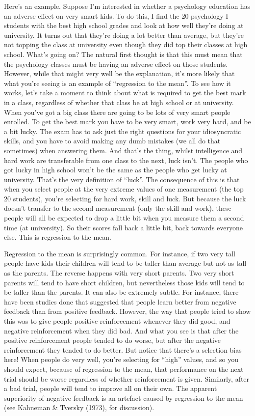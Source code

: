\documentclass[
  letterpaper,
]{book}
\begin{document}
Here's an example. Suppose I'm interested in whether a psychology
education has an adverse effect on very smart kids. To do this, I find
the 20 psychology I students with the best high school grades and look
at how well they're doing at university. It turns out that they're doing
a lot better than average, but they're not topping the class at
university even though they did top their classes at high school. What's
going on? The natural first thought is that this must mean that the
psychology classes must be having an adverse effect on those students.
However, while that might very well be the explanation, it's more likely
that what you're seeing is an example of ``regression to the mean''. To
see how it works, let's take a moment to think about what is required to
get the best mark in a class, regardless of whether that class be at
high school or at university. When you've got a big class there are
going to be lots of very smart people enrolled. To get the best mark you
have to be very smart, work very hard, and be a bit lucky. The exam has
to ask just the right questions for your idiosyncratic skills, and you
have to avoid making any dumb mistakes (we all do that sometimes) when
answering them. And that's the thing, whilst intelligence and hard work
are transferable from one class to the next, luck isn't. The people who
got lucky in high school won't be the same as the people who get lucky
at university. That's the very definition of ``luck''. The consequence
of this is that when you select people at the very extreme values of one
measurement (the top 20 students), you're selecting for hard work, skill
and luck. But because the luck doesn't transfer to the second
measurement (only the skill and work), these people will all be expected
to drop a little bit when you measure them a second time (at
university). So their scores fall back a little bit, back towards
everyone else. This is regression to the mean.

Regression to the mean is surprisingly common. For instance, if two very
tall people have kids their children will tend to be taller than average
but not as tall as the parents. The reverse happens with very short
parents. Two very short parents will tend to have short children, but
nevertheless those kids will tend to be taller than the parents. It can
also be extremely subtle. For instance, there have been studies done
that suggested that people learn better from negative feedback than from
positive feedback. However, the way that people tried to show this was
to give people positive reinforcement whenever they did good, and
negative reinforcement when they did bad. And what you see is that after
the positive reinforcement people tended to do worse, but after the
negative reinforcement they tended to do better. But notice that there's
a selection bias here! When people do very well, you're selecting for
``high'' values, and so you should expect, because of regression to the
mean, that performance on the next trial should be worse regardless of
whether reinforcement is given. Similarly, after a bad trial, people
will tend to improve all on their own. The apparent superiority of
negative feedback is an artefact caused by regression to the mean (see
Kahneman \& Tversky (1973), for discussion).
\end{document}
